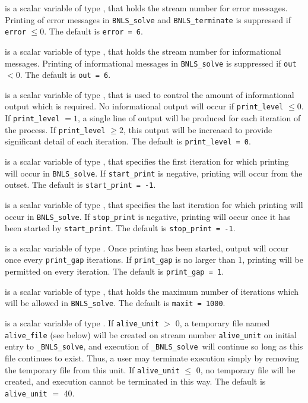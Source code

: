 \documentclass{galahad}
\newcommand{\packagename}{BNLS}
\newcommand{\fullpackagename}{\libraryname\_\packagename}
\newcommand{\solver}{{\tt \fullpackagename\_solve}}
\begin{document}
\begin{description}

 is a scalar variable of type \integer, that holds the
stream number for error messages. Printing of error messages in
{\tt \packagename\_solve} and {\tt \packagename\_terminate}
is suppressed if {\tt error} $\leq 0$.
The default is {\tt error = 6}.

 is a scalar variable of type \integer, that holds the
stream number for informational messages. Printing of informational messages in
{\tt \packagename\_solve} is suppressed if {\tt out} $< 0$.
The default is {\tt out = 6}.

 is a scalar variable of type \integer, that is used
to control the amount of informational output which is required. No
informational output will occur if {\tt print\_level} $\leq 0$. If
{\tt print\_level} $= 1$, a single line of output will be produced for each
iteration of the process. If {\tt print\_level} $\geq 2$, this output will be
increased to provide significant detail of each iteration.
The default is {\tt print\_level = 0}.

 is a scalar variable of type \integer, that specifies
the first iteration for which printing will occur in {\tt \packagename\_solve}.
If {\tt start\_print} is negative, printing will occur from the outset.
The default is {\tt start\_print = -1}.

 is a scalar variable of type \integer, that specifies
the last iteration for which printing will occur in  {\tt \packagename\_solve}.
If {\tt stop\_print} is negative, printing will occur once it has been
started by {\tt start\_print}.
The default is {\tt stop\_print = -1}.

 is a scalar variable of type \integer.
Once printing has been started, output will occur once every
{\tt print\_gap} iterations. If {\tt print\_gap} is no larger than 1,
printing will be permitted on every iteration.
The default is {\tt print\_gap = 1}.

 is a scalar variable of type \integer, that holds the
maximum number of iterations which will be allowed in {\tt \packagename\_solve}.
The default is {\tt maxit = 1000}.

 is a scalar variable of type \integer.
If {\tt alive\_unit} $>$ 0, a temporary file named {\tt alive\_file} (see below)
will be created on stream number {\tt alive\_unit} on initial entry to
\solver, and execution of \solver\ will continue so
long as this file continues to exist. Thus, a user may terminate execution
simply by removing the temporary file from this unit.
If {\tt alive\_unit} $\leq$ 0, no temporary file will be created, and
execution cannot be terminated in this way.
The default is {\tt alive\_unit} $=$ 40.


\end{description}
\end{document}
